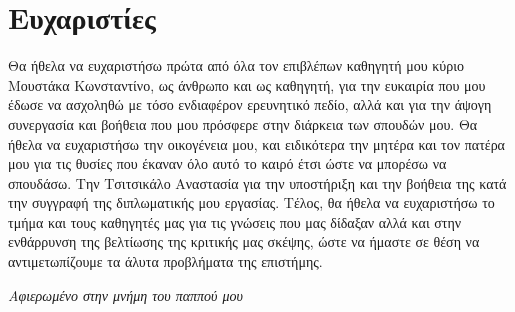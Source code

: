 \section*{Ευχαριστίες}

Θα ήθελα να ευχαριστήσω πρώτα από όλα τον επιβλέπων καθηγητή μου κύριο Μουστάκα Κωνσταντίνο, ως άνθρωπο και ως καθηγητή, για την ευκαιρία που μου έδωσε να ασχοληθώ με τόσο ενδιαφέρον ερευνητικό πεδίο, αλλά και για την άψογη συνεργασία και βοήθεια που μου πρόσφερε στην διάρκεια των σπουδών μου. Θα ήθελα να ευχαριστήσω την οικογένεια μου, και ειδικότερα την μητέρα και τον πατέρα μου για τις θυσίες που έκαναν όλο αυτό το καιρό έτσι ώστε να μπορέσω να σπουδάσω. Την Τσιτσικάλο Αναστασία για την υποστήριξη και την βοήθεια της κατά την συγγραφή της διπλωματικής μου εργασίας. Τέλος, θα ήθελα να ευχαριστήσω το τμήμα και τους καθηγητές μας για τις γνώσεις που μας δίδαξαν αλλά και στην ενθάρρυνση της βελτίωσης της κριτικής μας σκέψης, ώστε να ήμαστε σε θέση να αντιμετωπίζουμε τα άλυτα προβλήματα της επιστήμης.

\thispagestyle{empty}
\clearpage

\begin{center}
  \null\vfill
  \large{{\em Αφιερωμένο στην μνήμη του παππού μου}}
  \vspace{2cm}
  \null\vfill
\end{center}

\thispagestyle{empty} 